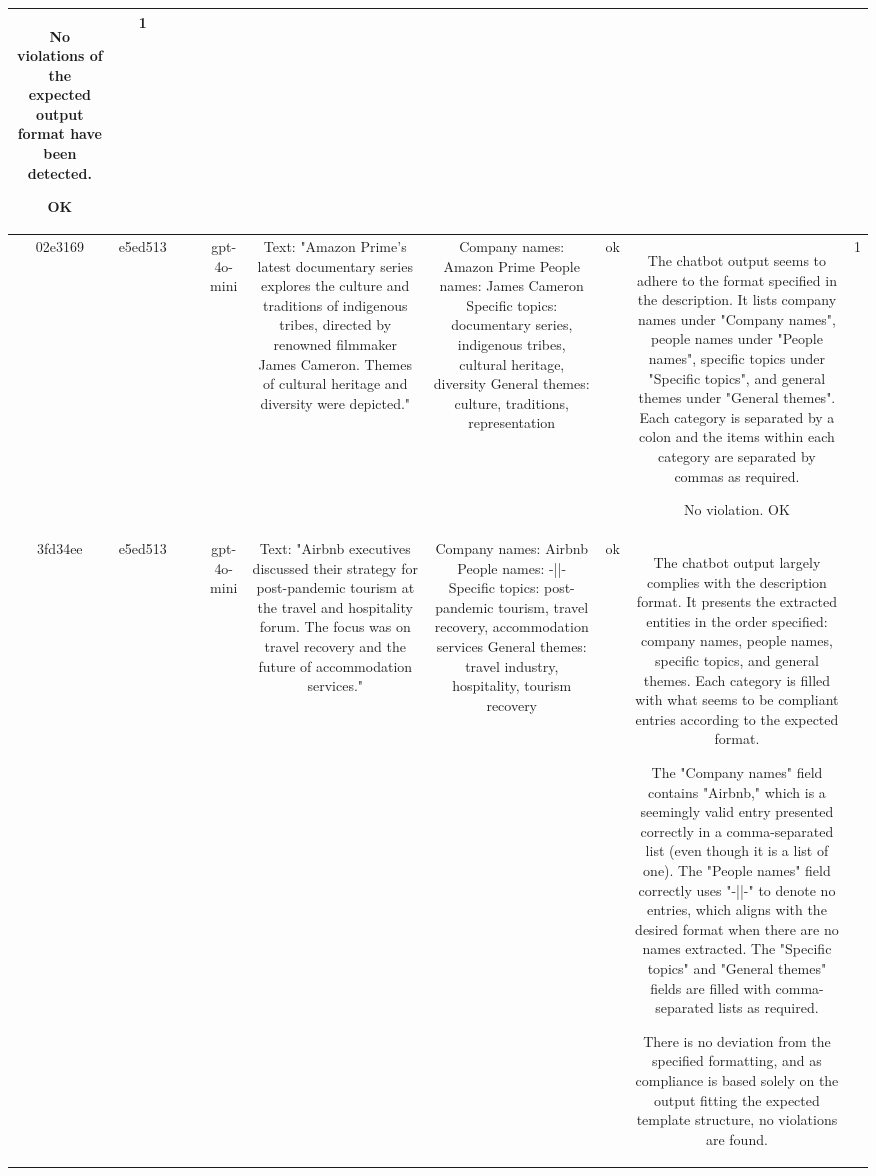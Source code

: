 \begin{table}[h!]
\begin{tabular}{|c|c|c|c|c|c|c|c|c|c|}
No violations of the expected output format have been detected.

OK & 1\\
\hline
02e3169 & e5ed513 &  &  & gpt-4o-mini & Text: "Amazon Prime's latest documentary series explores the culture and traditions of indigenous tribes, directed by renowned filmmaker James Cameron. Themes of cultural heritage and diversity were depicted." & Company names: Amazon Prime
People names: James Cameron
Specific topics: documentary series, indigenous tribes, cultural heritage, diversity
General themes: culture, traditions, representation & ok & The chatbot output seems to adhere to the format specified in the description. It lists company names under "Company names", people names under "People names", specific topics under "Specific topics", and general themes under "General themes". Each category is separated by a colon and the items within each category are separated by commas as required.

No violation.
OK & 1\\
\hline
3fd34ee & e5ed513 &  &  & gpt-4o-mini & Text: "Airbnb executives discussed their strategy for post-pandemic tourism at the travel and hospitality forum. The focus was on travel recovery and the future of accommodation services." & Company names: Airbnb
People names: -||-
Specific topics: post-pandemic tourism, travel recovery, accommodation services
General themes: travel industry, hospitality, tourism recovery & ok & The chatbot output largely complies with the description format. It presents the extracted entities in the order specified: company names, people names, specific topics, and general themes. Each category is filled with what seems to be compliant entries according to the expected format. 

The "Company names" field contains "Airbnb," which is a seemingly valid entry presented correctly in a comma-separated list (even though it is a list of one). The "People names" field correctly uses "-||-" to denote no entries, which aligns with the desired format when there are no names extracted. The "Specific topics" and "General themes" fields are filled with comma-separated lists as required.

There is no deviation from the specified formatting, and as compliance is based solely on the output fitting the expected template structure, no violations are found.


\end{tabular}
\end{table}
